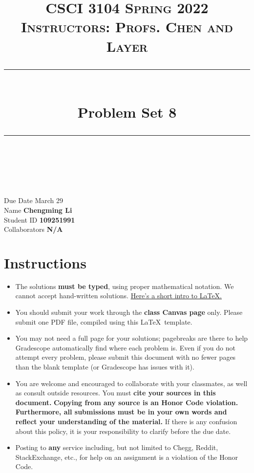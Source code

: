 \documentclass[11pt]{article}
\title{
\normalfont \normalsize 
\textsc{CSCI 3104 Spring 2022 \\ 
Instructors: Profs. Chen and Layer} \\
[10pt] 
\rule{\linewidth}{0.5pt} \\[6pt] 
\huge Problem Set 8 \\
\rule{\linewidth}{2pt}  \\[10pt]
}
\date{}
\theoremstyle{definition}
\theoremstyle{definition}
\theoremstyle{definition}
\begin{document}
\maketitle


\noindent
Due Date \dotfill March 29 \\
Name \dotfill \textbf{Chengming Li} \\
Student ID \dotfill \textbf{109251991} \\
Collaborators \dotfill \textbf{N/A}

\tableofcontents

\section{Instructions}
 \begin{itemize}
	\item The solutions \textbf{must be typed}, using proper mathematical notation. We cannot accept hand-written solutions. \href{http://ece.uprm.edu/~caceros/latex/introduction.pdf}{Here's a short intro to \LaTeX.}
	\item You should submit your work through the \textbf{class Canvas page} only. Please submit one PDF file, compiled using this \LaTeX \ template.
	\item You may not need a full page for your solutions; pagebreaks are there to help Gradescope automatically find where each problem is. Even if you do not attempt every problem, please submit this document with no fewer pages than the blank template (or Gradescope has issues with it).

	\item You are welcome and encouraged to collaborate with your classmates, as well as consult outside resources. You must \textbf{cite your sources in this document.} \textbf{Copying from any source is an Honor Code violation. Furthermore, all submissions must be in your own words and reflect your understanding of the material.} If there is any confusion about this policy, it is your responsibility to clarify before the due date. 

	\item Posting to \textbf{any} service including, but not limited to Chegg, Reddit, StackExchange, etc., for help on an assignment is a violation of the Honor Code.
\end{itemize}
\end{document}
